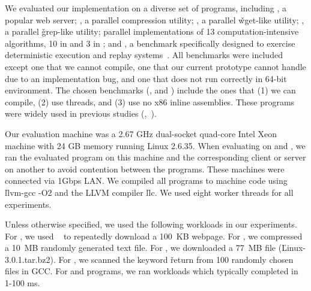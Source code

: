 We evaluated our \peregrine implementation on a diverse set of \nprog programs,
including \apache, a popular web server; \pbzip, a parallel compression
utility; \aget, a parallel \v{wget}-like utility; \pfscan, a parallel
\v{grep}-like utility; parallel implementations of 13
computation-intensive algorithms, 10 in \splash and 3 in \parsec; and
\racey, a benchmark specifically designed to exercise deterministic
execution and replay systems~\cite{racy-stress}.  All \splash benchmarks
were included except one that we cannot compile, one that our current prototype
cannot handle due to an implementation bug, and one that does not run
correctly in 64-bit environment.  The chosen \parsec benchmarks
(\blackscholes, \swaptions and \streamcluster) include the ones that (1)
we can compile, (2) use threads, and (3) use no x86 inline assemblies.
These programs were widely used in previous studies (\eg,~\cite{lu:concurrency-bugs,syncfinder:osdi10,grace:oopsla09}).

Our evaluation machine was a 2.67 GHz dual-socket quad-core Intel Xeon
machine with 24 GB memory running Linux 2.6.35.  When evaluating \peregrine on
\apache and \aget, we ran the evaluated program on this machine and the
corresponding client or server on another to avoid contention
between the programs.  These machines were connected via 1Gbps LAN.  We
compiled all programs to machine code using \v{llvm-gcc -O2} and the
LLVM compiler \v{llc}.  We used eight worker threads for all
experiments.

Unless otherwise specified, we used the following workloads in our
experiments.  For \apache, we used \ab~\cite{apachebench} to repeatedly
download a 100~KB webpage. For \pbzip, we compressed a 10~MB randomly
generated text file.
For \aget, we downloaded a 77~MB file (\v{Linux-3.0.1.tar.bz2}). 
For \pfscan, we scanned the keyword \v{return} from 100 randomly chosen
files in GCC.  For \splash and \parsec programs, 
we ran workloads which typically completed in 1-100 ms.

